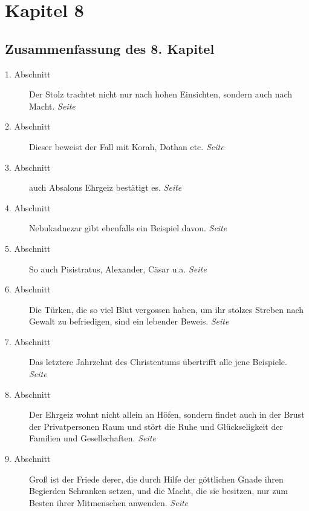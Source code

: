 
\chapter{Kapitel 8} \label{kap8}

\section{Zusammenfassung des 8. Kapitel}


\begin{description}
\item[1. Abschnitt] Der Stolz trachtet nicht nur nach hohen Einsichten, sondern
auch nach Macht.
\dotfill \textit{Seite~\pageref{kap8_ab1}}\\
\item[2. Abschnitt] Dieser beweist der Fall mit Korah, Dothan etc.
\dotfill \textit{Seite~\pageref{kap8_ab2}}\\
\item[3. Abschnitt] auch Absalons Ehrgeiz bestätigt es.
\dotfill \textit{Seite~\pageref{kap8_ab3}}\\
\item[4. Abschnitt] Nebukadnezar gibt ebenfalls ein Beispiel davon.
\dotfill \textit{Seite~\pageref{kap8_ab4}}\\
\item[5. Abschnitt] So auch Pisistratus, Alexander, Cäsar u.a.
\dotfill \textit{Seite~\pageref{kap8_ab5}}\\
\item[6. Abschnitt] Die Türken, die so viel Blut vergossen haben, um ihr stolzes
Streben nach Gewalt zu befriedigen, sind ein lebender Beweis.
\dotfill \textit{Seite~\pageref{kap8_ab6}}\\
\item[7. Abschnitt] Das letztere Jahrzehnt des Christentums übertrifft alle
jene Beispiele.
\dotfill \textit{Seite~\pageref{kap8_ab7}}\\
\item[8. Abschnitt] Der Ehrgeiz wohnt nicht allein an Höfen, sondern findet auch
in der Brust der Privatpersonen Raum und stört die Ruhe und Glückseligkeit der
Familien und Gesellschaften.
\dotfill \textit{Seite~\pageref{kap8_ab8}}\\
\item[9. Abschnitt] Groß ist der Friede derer, die durch Hilfe der göttlichen
Gnade ihren Begierden Schranken setzen, und die Macht, die sie besitzen, nur zum
Besten ihrer Mitmenschen anwenden.
\dotfill \textit{Seite~\pageref{kap8_ab9}}\\

\end{description}

